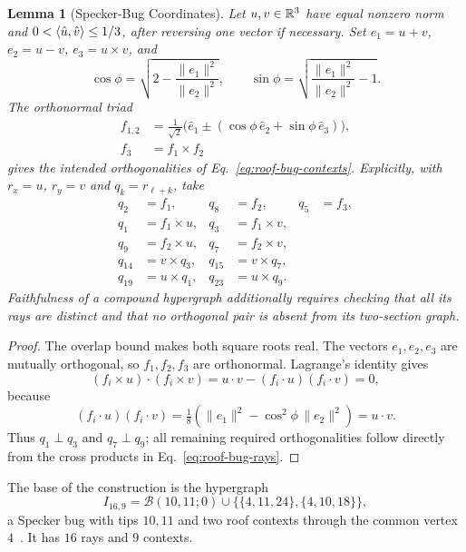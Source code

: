 \documentclass[aps,pra,reprint,superscriptaddress,longbibliography,nofootinbib,floatfix,10pt]{revtex4-2}
\newtheorem{lemma}[theorem]{Lemma}
\theoremstyle{definition}\newtheorem{definition}[theorem]{Definition}
\theoremstyle{remark}\newtheorem{remark}[theorem]{Remark}
\begin{document}
\begin{lemma}[Specker-Bug Coordinates]\label{lem:bug-triad}
Let $u,v\in\mathbb R^3$ have equal nonzero norm and
$0<\langle \hat u,\hat v\rangle\le1/3$, after reversing one vector if necessary. Set $e_1=u+v$, $e_2=u-v$, $e_3=u\times v$, and
\begin{equation}\label{eq:universal-phi}
\cos\phi=\sqrt{2-\frac{\|e_1\|^2}{\|e_2\|^2}},\qquad
\sin\phi=\sqrt{\frac{\|e_1\|^2}{\|e_2\|^2}-1}.
\end{equation}
The orthonormal triad
\begin{equation}\label{eq:universal-triad}
\begin{aligned}
f_{1,2}&=\tfrac1{\sqrt2}\bigl(\hat e_1\pm
 (\cos\phi\,\hat e_2+\sin\phi\,\hat e_3)\bigr),\\
f_3&=f_1\times f_2
\end{aligned}
\end{equation}
gives the intended orthogonalities of Eq.~\eqref{eq:roof-bug-contexts}. Explicitly, with $r_x=u$, $r_y=v$ and $q_k=r_{\ell+k}$, take
\begin{equation}\label{eq:roof-bug-rays}
\begin{aligned}
q_2&=f_1,& q_8&=f_2,&q_5&=f_3,\\
q_1&=f_1\times u,&q_3&=f_1\times v,\\
q_9&=f_2\times u,&q_7&=f_2\times v,\\
q_{14}&=v\times q_3,&q_{15}&=v\times q_7,\\
q_{19}&=u\times q_1,&q_{23}&=u\times q_9.
\end{aligned}
\end{equation}
Faithfulness of a compound hypergraph additionally requires checking that all its rays are distinct and that no orthogonal pair is absent from its two-section graph.
\end{lemma}
\begin{proof}
The overlap bound makes both square roots real. The vectors $e_1,e_2,e_3$ are mutually orthogonal, so $f_1,f_2,f_3$ are orthonormal. Lagrange's identity gives
\[
(f_i\times u)\cdot(f_i\times v)
=u\cdot v-(f_i\cdot u)(f_i\cdot v)=0,
\]
because
\[
(f_i\cdot u)(f_i\cdot v)
=\tfrac18(\|e_1\|^2-\cos^2\phi\,\|e_2\|^2)
=u\cdot v.
\]
Thus $q_1\perp q_3$ and $q_7\perp q_9$; all remaining required orthogonalities follow directly from the cross products in Eq.~\eqref{eq:roof-bug-rays}.
\end{proof}

The base of the construction is the hypergraph
\begin{equation}\label{eq:I16-def}
I_{16,9}=\mathcal B(10,11;0)\cup\bigl\{\{4,11,24\},\{4,10,18\}\bigr\},
\end{equation}
a Specker bug with tips $10,11$ and two roof contexts through the common vertex $4$~\cite{svozil-2026-chromaticcoordinatization}. It has $16$ rays and $9$ contexts.
\end{document}
